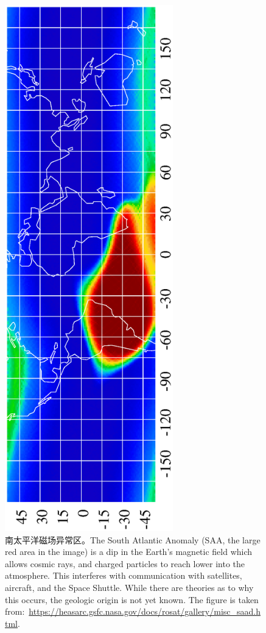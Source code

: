 \begin{figure}
\centering
\includegraphics[width=0.65\textwidth,angle=-90]{figs/saad.ps}
\caption{南太平洋磁场异常区。The South Atlantic Anomaly (SAA, the large red area in the image)
is a dip in the Earth's magnetic field which allows cosmic rays, and charged particles to
reach lower into the atmosphere. This interferes with communication with satellites, aircraft,
and the Space Shuttle. While there are theories as to why this occurs, the geologic origin
is not yet known. The figure is taken
from:~\url{https://heasarc.gsfc.nasa.gov/docs/rosat/gallery/misc_saad.html}.}
\label{fig:saad2}
\end{figure}

